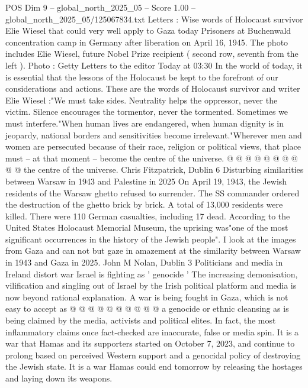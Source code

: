 \begin{textsample}{POS Dim 9 – global\_north\_2025\_05 – Score 1.00 – global\_north\_2025\_05/125067834.txt}  \label{ex:f9_pos_361}
Letters : Wise words of Holocaust survivor Elie Wiesel that could very well apply to Gaza today Prisoners at Buchenwald concentration camp in Germany after liberation on April 16, 1945.
The photo includes Elie Wiesel, future Nobel Prize recipient ( second row, seventh from the left ).
Photo : Getty Letters to the editor Today at 03:30 In the world of today, it is essential that the lessons of the Holocaust be kept to the forefront of our considerations and actions.
These are the words of Holocaust survivor and writer Elie Wiesel :"We must take sides.
Neutrality helps the oppressor, never the victim.
Silence encourages the tormentor, never the tormented.
Sometimes we must interfere."When human lives are endangered, when human dignity is in jeopardy, national borders and sensitivities become irrelevant."Wherever men and women are persecuted because of their race, religion or political views, that place must -- at that moment -- become the centre of the universe. @ @ @ @ @ @ @ @ @ @ the centre of the universe.
Chris Fitzpatrick, Dublin 6 Disturbing similarities between Warsaw in 1943 and Palestine in 2025 On April 19, 1943, the Jewish residents of the Warsaw ghetto refused to surrender.
The SS commander ordered the destruction of the ghetto brick by brick.
A total of 13,000 residents were killed.
There were 110 German casualties, including 17 dead.
According to the United States Holocaust Memorial Museum, the uprising was"one of the most significant occurrences in the history of the Jewish people".
I look at the images from Gaza and can not but gaze in amazement at the similarity between Warsaw in 1943 and Gaza in 2025.
John M Nolan, Dublin 3 Politicians and media in Ireland distort war Israel is fighting as ' genocide ' The increasing demonisation, vilification and singling out of Israel by the Irish political platform and media is now beyond rational explanation.
A war is being fought in Gaza, which is not easy to accept as @ @ @ @ @ @ @ @ @ @ a genocide or ethnic cleansing as is being claimed by the media, activists and political elites.
In fact, the most inflammatory claims once fact-checked are inaccurate, false or media spin.
It is a war that Hamas and its supporters started on October 7, 2023, and continue to prolong based on perceived Western support and a genocidal policy of destroying the Jewish state.
It is a war Hamas could end tomorrow by releasing the hostages and laying down its weapons.

\end{textsample}

